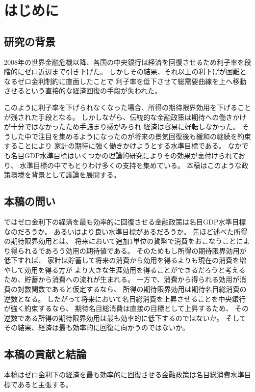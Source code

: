 
\chapter{はじめに}
\label{chap:intro}

\section{研究の背景}
\label{sec:intro_background}
2008年の世界金融危機以降、各国の中央銀行は経済を回復させるため利子率を段階的にゼロ近辺まで引き下げた。
しかしその結果、それ以上の利下げが困難となるゼロ金利制約に直面したことで
利子率を低下させて総需要曲線を上へ移動させるという直接的な経済回復の手段が失われた。

このように利子率を下げられなくなった場合、所得の期待限界効用を下げることが残された手段となる。
しかしながら、伝統的な金融政策は期待への働きかけが十分ではなかったため手詰まり感がみられ
経済は容易に好転しなかった。
そうした中で注目を集めるようになったのが将来の景気回復後も緩和の継続を約束することにより
家計の期待に強く働きかけようとする水準目標である。
なかでも名目GDP水準目標はいくつかの理論的研究によりその効果が裏付けられており、
水準目標の中でもとりわけ多くの支持を集めている。
本稿はこのような政策環境を背景として議論を展開する。

\section{本稿の問い}
\label{sec:intro_question}
ではゼロ金利下の経済を最も効率的に回復させる金融政策は名目GDP水準目標なのだろうか。
あるいはより良い水準目標があるだろうか。
先ほど述べた所得の期待限界効用とは、
将来において追加1単位の貨幣で消費をおこなうことにより得られるであろう効用の期待値である。
そのためもし所得の期待限界効用が低下すれば、
家計は貯蓄して将来の消費から効用を得るよりも現在の消費を増やして効用を得る方が
より大きな生涯効用を得ることができるだろうと考えるため、貯蓄から消費への流れが生まれる。
一方で、消費から得られる効用が消費の対数関数であると仮定するなら、
所得の期待限界効用は期待名目総消費の逆数となる。
したがって将来において名目総消費を上昇させることを中央銀行が強く約束するなら、
期待名目総消費は直接の目標として上昇するため、
その逆数である所得の期待限界効用は最も効率的に低下するのではないか。
そしてその結果、経済は最も効率的に回復に向かうのではないか。

\section{本稿の貢献と結論}
\label{sec:intro_contribution}
本稿はゼロ金利下の経済を最も効率的に回復させる金融政策は名目総消費水準目標であると主張する。

